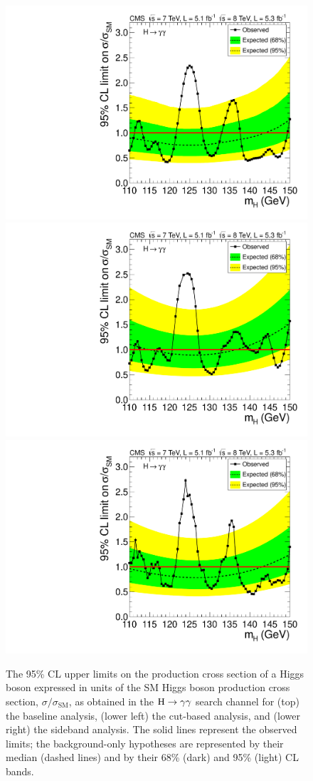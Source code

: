 \documentclass[11pt,twoside,a4paper,cmspaper,final,collab]{cms-tdr}
\begin{document}
\begin{figure}[htbp]
    \begin{center}
      \includegraphics[width=0.49\linewidth]{figures/hgg_MassFactLimit}  \\
     \includegraphics[width=0.49\linewidth]{figures/hgg_BaselineLimit}
      \includegraphics[width=0.49\linewidth]{figures/hgg_MassWindowLimit}
     \caption{The 95\% CL upper limits
on the production cross section of a Higgs boson
expressed in units of the SM Higgs boson production cross section,
$\sigma / \sigma_\text{SM}$,
     as obtained in the $\mathrm{H} \to \gamma\gamma$ search channel for
     (top) the baseline analysis,
     (lower left) the cut-based analysis, and
     (lower right) the sideband analysis.
     The solid lines represent the observed limits;
     the background-only hypotheses are represented by their median (dashed
     lines) and by their 68\% (dark) and 95\% (light) CL bands.
       }
      \label{fig:LimitGaGa}
    \end{center}
\end{figure}
\end{document}

